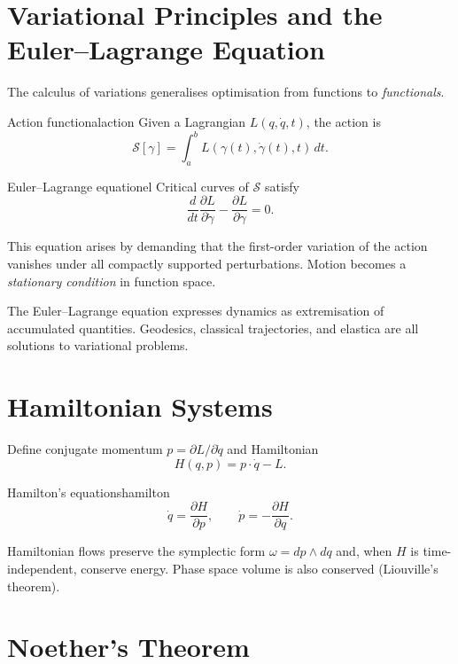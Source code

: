 \documentclass[12pt,openany]{book}
\begin{document}
\section{Variational Principles and the Euler--Lagrange Equation}

The calculus of variations generalises optimisation from functions to
\emph{functionals}.

\begin{definition}{Action functional}{action}
  Given a Lagrangian $L(q,\dot q,t)$, the action is
  \[
    \mathcal{S}[\gamma] = \int_a^b L(\gamma(t),\dot\gamma(t),t)\,dt.
  \]
\end{definition}

\begin{theorem}{Euler--Lagrange equation}{el}
  Critical curves of $\mathcal{S}$ satisfy
  \[
    \frac{d}{dt}\frac{\partial L}{\partial\dot\gamma}
    - \frac{\partial L}{\partial\gamma} = 0.
  \]
\end{theorem}

This equation arises by demanding that the first-order variation of the action
vanishes under all compactly supported perturbations. Motion becomes a
\emph{stationary condition} in function space.

\begin{insight}
  The Euler--Lagrange equation expresses dynamics as extremisation of accumulated
  quantities. Geodesics, classical trajectories, and elastica are all solutions
  to variational problems.
\end{insight}

\section{Hamiltonian Systems}

Define conjugate momentum $p=\partial L/\partial\dot q$ and Hamiltonian
\[
  H(q,p) = p\cdot\dot q - L.
\]

\begin{theorem}{Hamilton's equations}{hamilton}
  \[
    \dot q = \frac{\partial H}{\partial p}, \qquad
    \dot p = -\frac{\partial H}{\partial q}.
  \]
\end{theorem}

Hamiltonian flows preserve the symplectic form $\omega=dp\wedge dq$ and, when
$H$ is time-independent, conserve energy. Phase space volume is also conserved
(Liouville's theorem).

\section{Noether's Theorem}
\end{document}
